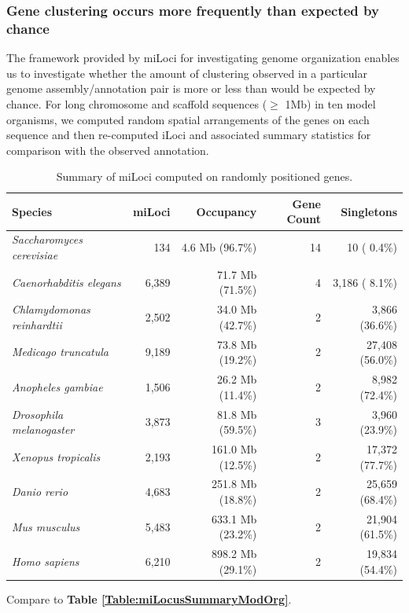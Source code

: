 \subsubsection{Gene clustering occurs more frequently than expected by chance}

The framework provided by miLoci for investigating genome organization enables us to investigate whether the amount of clustering observed in a particular genome assembly/annotation pair is more or less than would be expected by chance.
For long chromosome and scaffold sequences ($\geq$ 1Mb) in ten model organisms, we computed random spatial arrangements of the genes on each sequence and then re-computed iLoci and associated summary statistics for comparison with the observed annotation.

\begin{table}[h]
\small
\caption{Summary of miLoci computed on randomly positioned genes.}
\label{Table:miLocusSummaryShuffled}
\begin{tabularx}{\textwidth}{lrrrr}
\hline
Species                                &               miLoci &            Occupancy &           Gene Count &           Singletons  \\ \hline
\textit{Saccharomyces cerevisiae}      &                  134 &      4.6 Mb (96.7\%) &                   14 &          10 ( 0.4\%)  \\
\textit{Caenorhabditis elegans}        &                6,389 &     71.7 Mb (71.5\%) &                    4 &       3,186 ( 8.1\%)  \\
\textit{Chlamydomonas reinhardtii}     &                2,502 &     34.0 Mb (42.7\%) &                    2 &       3,866 (36.6\%)  \\
\textit{Medicago truncatula}           &                9,189 &     73.8 Mb (19.2\%) &                    2 &      27,408 (56.0\%)  \\
\textit{Anopheles gambiae}             &                1,506 &     26.2 Mb (11.4\%) &                    2 &       8,982 (72.4\%)  \\
\textit{Drosophila melanogaster}       &                3,873 &     81.8 Mb (59.5\%) &                    3 &       3,960 (23.9\%)  \\
\textit{Xenopus tropicalis}            &                2,193 &    161.0 Mb (12.5\%) &                    2 &      17,372 (77.7\%)  \\
\textit{Danio rerio}                   &                4,683 &    251.8 Mb (18.8\%) &                    2 &      25,659 (68.4\%)  \\
\textit{Mus musculus}                  &                5,483 &    633.1 Mb (23.2\%) &                    2 &      21,904 (61.5\%)  \\
\textit{Homo sapiens}                  &                6,210 &    898.2 Mb (29.1\%) &                    2 &      19,834 (54.4\%)  \\ \hline
\end{tabularx}
\raggedright
{\scriptsize
Compare to \textbf{Table \ref{Table:miLocusSummaryModOrg}}.
}
\end{table}


